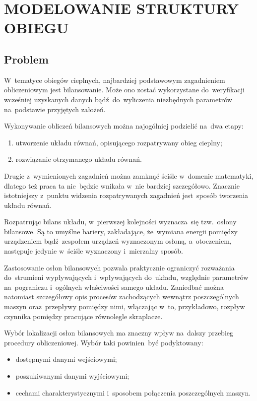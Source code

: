 \section{MODELOWANIE STRUKTURY OBIEGU}

\subsection{Problem}

W~tematyce obiegów cieplnych, najbardziej podstawowym zagadnieniem
obliczeniowym jest bilansowanie. Może ono zostać wykorzystane
do~weryfikacji wcześniej uzyskanych danych bądź~do~wyliczenia
niezbędnych parametrów na~podstawie przyjętych założeń.

Wykonywanie obliczeń bilansowych można najogólniej podzielić na~dwa
etapy:

\begin{enumerate}

\item utworzenie układu równań, opisującego rozpatrywany obieg cieplny;

\item rozwiązanie otrzymanego układu równań.

\end{enumerate}

Drugie z~wymienionych zagadnień można zamknąć ściśle w~domenie
matematyki, dlatego też praca ta nie~będzie wnikała w~nie bardziej
szczegółowo. Znacznie istotniejszy z~punktu widzenia rozpatrywanych
zagadnień jest~sposób tworzenia układu równań.

Rozpatrując bilans układu, w~pierwszej kolejności wyznacza~się
tzw.~osłony bilansowe. Są to umyślne bariery, zakładające, że~wymiana
energii pomiędzy urządzeniem bądź~zespołem urządzeń wyznaczonym osłoną,
a~otoczeniem, następuje jedynie w~ściśle wyznaczony i~mierzalny sposób.

Zastosowanie osłon bilansowych pozwala praktycznie ograniczyć rozważania
do~strumieni wypływających i~wpływających do~układu, względnie
parametrów na~pograniczu i~ogólnych właściwości samego układu. Zaniedbać
można natomiast szczegółowy opis procesów zachodzących wewnątrz
poszczególnych maszyn oraz~przepływy pomiędzy nimi, włączając w~to,
przykładowo, rozpływ czynnika pomiędzy pracujące równolegle skraplacze.

Wybór lokalizacji osłon bilansowych ma znaczny wpływ na~dalszy przebieg
procedury obliczeniowej. Wybór taki powinien~być podyktowany:

\begin{itemize}

\item dostępnymi danymi wejściowymi;

\item poszukiwanymi danymi wyjściowymi;

\item cechami charakterystycznymi i~sposobem połączenia poszczególnych
	maszyn.

\end{itemize}

